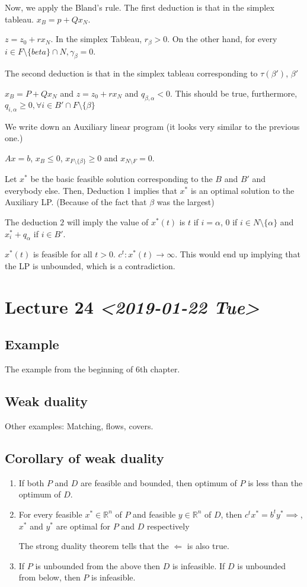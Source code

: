\documentclass[11pt]{article}
\def\R{\mathbb{R}}
\begin{document}
Now, we apply the Bland's rule. The first deduction is that in the simplex
tableau. \(x_B = p + Q x_N\).

\(z = z_0 + r x_N\). In the simplex Tableau, \(r_\beta > 0\). On the other hand,
for every \(i \in F \setminus \{beta\} \cap N, \gamma_\beta = 0\).

The second deduction is that in the simplex tableau corresponding to
\(\tau(\beta')\), \(\beta'\)

\(x_B = P + Q x_N\) and \(z = z_0 + r x_N\) and \(q_{\beta, \alpha} < 0\). This
should be true, furthermore, \(q_{i, \alpha} \ge 0, \forall i \in B' \cap F
   \setminus \{\beta\}\)

We write down an Auxiliary linear program (it looks very similar to the
previous one.)

\(Ax = b\), \(x_B \le 0\), \(x_{F \setminus \{\beta\}} \ge 0\) and \(x_{N \setminus
   F} = 0\).

Let \(x^{ * }\) be the basic feasible solution corresponding to the \(B\) and \(B'\)
and everybody else. Then, Deduction 1 implies that \(x^{ * }\) is an optimal
solution to the Auxiliary LP. (Because of the fact that \(\beta\) was the largest)

The deduction \(2\) will imply the value of \(x^{ * }(t)\) is \(t\) if \(i =
   \alpha\), \(0\) if \(i \in N \setminus \{\alpha\}\) and \(x_{i}^{ * } + q_{\alpha}\)
if \(i \in B'\).

\(x^{*}(t)\) is feasible for all \(t > 0\). \(c^{t} \colon x^{ * }(t) \rightarrow
   \infty\). This would end up implying that the LP is unbounded, which is a
contradiction.
\section{Lecture 24 \textit{<2019-01-22 Tue>}}
\label{sec:org374a161}
\subsection{Example}
\label{sec:orgc53fa95}
The example from the beginning of 6th chapter.
\subsection{Weak duality}
\label{sec:orgc4d33c8}
Other examples: Matching, flows, covers.
\subsection{Corollary of weak duality}
\label{sec:org66b9555}
\begin{enumerate}
\item If both \(P\) and \(D\) are feasible and bounded, then optimum of \(P\) is less
than the optimum of \(D\).
\item For every feasible \(x^{*} \in \R^n\) of \(P\) and feasible \(y \in \R^n\) of
\(D\), then \(c^{t} x^{ * } = b^t y^{ * } \implies\), \(x^{ * }\) and \(y^{ * }\)
are optimal for \(P\) and \(D\) respectively

The strong duality theorem tells that the \(\Leftarrow\) is also true.
\item If \(P\) is unbounded from the above then \(D\) is infeasible. If \(D\) is
unbounded from below, then \(P\) is infeasible.
\end{enumerate}
\end{document}

